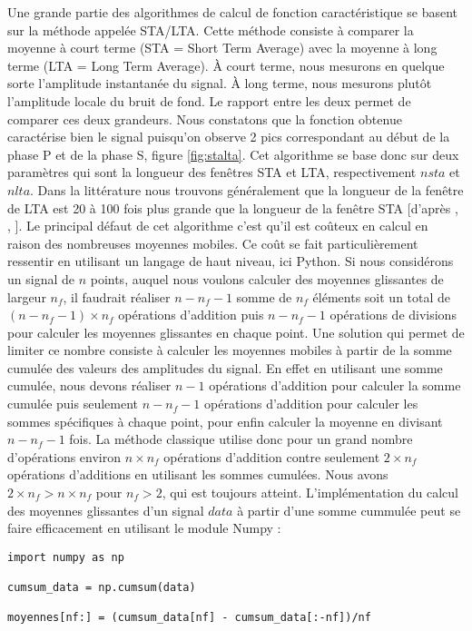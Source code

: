 \documentclass[a4paper, 11pt]{article} %
\begin{document}
Une grande partie des algorithmes de calcul de fonction caractéristique se basent sur la méthode appelée STA/LTA. Cette méthode consiste à comparer la moyenne à court terme (STA = Short Term Average) avec la moyenne à long terme (LTA = Long Term Average). 
À court terme, nous mesurons en quelque sorte l'amplitude instantanée du signal. À long terme, nous mesurons plutôt l'amplitude locale du bruit de fond. Le rapport entre les deux permet de comparer ces deux grandeurs. Nous constatons que la fonction obtenue caractérise bien le signal puisqu'on observe 2 pics correspondant au début de la phase P et de la phase S, figure \ref{fig:stalta}.
Cet algorithme se base donc sur deux paramètres qui sont la longueur des fenêtres STA et LTA, respectivement $nsta$ et $nlta$. Dans la littérature nous trouvons généralement que la longueur de la fenêtre de LTA est 20 à 100 fois plus grande que la longueur de la fenêtre STA [d'après \cite{kuperkoch2010}, \cite{vassallo2012}, \cite{phasenet2018}].
Le principal défaut de cet algorithme c'est qu'il est coûteux en calcul en raison des nombreuses moyennes mobiles. Ce coût se fait particulièrement ressentir en utilisant un langage de haut niveau, ici Python. Si nous considérons un signal de $n$ points, auquel nous voulons calculer des moyennes glissantes de largeur $n_f$, il faudrait réaliser $n-n_f-1$ somme de $n_f$ éléments soit un total de $(n-n_f-1) \times n_f$ opérations d'addition puis $n-n_f-1$ opérations de divisions pour calculer les moyennes glissantes en chaque point. Une solution qui permet de limiter ce nombre consiste à calculer les moyennes mobiles à partir de la somme cumulée des valeurs des amplitudes du signal. En effet en utilisant une somme cumulée, nous devons réaliser $n-1$ opérations d'addition pour calculer la somme cumulée puis seulement $n-n_f-1$ opérations d'addition pour calculer les sommes spécifiques à chaque point, pour enfin calculer la moyenne en divisant $n-n_f-1$ fois. La méthode classique utilise donc pour un grand nombre d'opérations environ $n \times n_f$ opérations d'addition contre seulement $2 \times n_f$ opérations d'additions en utilisant les sommes cumulées. Nous avons $2 \times n_f > n \times n_f$ pour $n_f > 2$, qui est toujours atteint. L'implémentation du calcul des moyennes glissantes d'un signal $data$ à partir d'une somme cummulée peut se faire efficacement en utilisant le module Numpy :

\begin{verbatim}
import numpy as np

cumsum_data = np.cumsum(data)

moyennes[nf:] = (cumsum_data[nf] - cumsum_data[:-nf])/nf
\end{verbatim}
\end{document}
